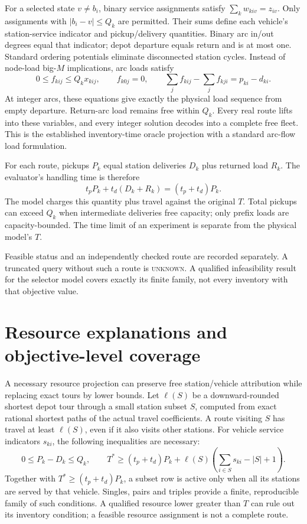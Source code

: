 \documentclass[11pt]{article}
\begin{document}
For a selected state $v\ne b_i$, binary service assignments satisfy
$\sum_k w_{kiv}=z_{iv}$. Only assignments with $|b_i-v|\le Q_k$ are
permitted. Their sums define each vehicle's station-service indicator and
pickup/delivery quantities. Binary arc in/out degrees equal that indicator;
depot departure equals return and is at most one. Standard ordering
potentials eliminate disconnected station cycles. Instead of node-load
big-$M$ implications, arc loads satisfy
\[
 0\le f_{kij}\le Q_kx_{kij},\qquad f_{k0j}=0,\qquad
 \sum_j f_{kij}-\sum_j f_{kji}=p_{ki}-d_{ki}.
\]
At integer arcs, these equations give exactly the physical load sequence
from empty departure. Return-arc load remains free within $Q_k$. Every
real route lifts into these variables, and every integer solution decodes
into a complete free fleet. This is the established inventory-time oracle
projection with a standard arc-flow load formulation.

For each route, pickups $P_k$ equal station deliveries $D_k$ plus returned
load $R_k$. The evaluator's handling time is therefore
\[
 t_pP_k+t_d(D_k+R_k)=(t_p+t_d)P_k.
\]
The model charges this quantity plus travel against the original $T$.
Total pickups can exceed $Q_k$ when intermediate deliveries free capacity;
only prefix loads are capacity-bounded. The time limit of an experiment
is separate from the physical model's $T$.

Feasible status and an independently checked route are recorded separately.
A truncated query without such a route is \textsc{unknown}. A qualified
infeasibility result for the selector model covers exactly its finite
family, not every inventory with that objective value.

\section{Resource explanations and objective-level coverage}
A necessary resource projection can preserve free station/vehicle
attribution while replacing exact tours by lower bounds. Let $\ell(S)$
be a downward-rounded shortest depot tour through a small station subset
$S$, computed from exact rational shortest paths of the actual travel
coefficients. A route visiting $S$ has travel at least $\ell(S)$, even
if it also visits other stations. For vehicle service indicators $s_{ki}$,
the following inequalities are necessary:
\[
 0\le P_k-D_k\le Q_k,\qquad
 T^*\ge(t_p+t_d)P_k+
 \ell(S)\left(\sum_{i\in S}s_{ki}-|S|+1\right).
\]
Together with $T^*\ge(t_p+t_d)P_k$, a subset row is active only when
all its stations are served by that vehicle. Singles, pairs and triples
provide a finite, reproducible family of such conditions. A qualified
resource lower greater than $T$ can rule out its inventory condition;
a feasible resource assignment is not a complete route.
\end{document}

